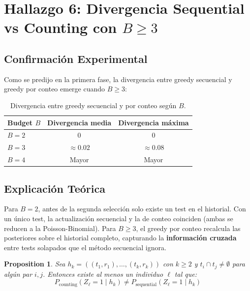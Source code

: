 \documentclass[11pt, a4paper]{article}
\newtheorem{proposition}{Proposition}
\begin{document}
\section{Hallazgo 6: Divergencia Sequential vs Counting con $B \geq 3$}
\label{sec:divergence}

\subsection{Confirmaci\'on Experimental}
Como se predijo en la primera fase, la divergencia entre greedy
secuencial y greedy por conteo emerge cuando $B \geq 3$:

\begin{table}[htbp]
\centering
\caption{Divergencia entre greedy secuencial y por conteo seg\'un $B$.}
\begin{tabular}{lcc}
\toprule
\textbf{Budget $B$} & \textbf{Divergencia media} & \textbf{Divergencia m\'axima} \\
\midrule
$B = 2$ & $0$ & $0$ \\
$B = 3$ & $\approx 0.02$ & $\approx 0.08$ \\
$B = 4$ & Mayor & Mayor \\
\bottomrule
\end{tabular}
\end{table}

\subsection{Explicaci\'on Te\'orica}
Para $B = 2$, antes de la segunda selecci\'on solo existe un test en el
historial. Con un \'unico test, la actualizaci\'on secuencial y la de
conteo coinciden (ambas se reducen a la Poisson-Binomial). Para
$B \geq 3$, el greedy por conteo recalcula las posteriores sobre el
historial completo, capturando la \textbf{informaci\'on cruzada} entre
tests solapados que el m\'etodo secuencial ignora.

\begin{proposition}
Sea $h_k = ((t_1, r_1), \ldots, (t_k, r_k))$ con $k \geq 2$ y
$t_i \cap t_j \neq \emptyset$ para alg\'un par $i, j$. Entonces existe
al menos un individuo $\ell$ tal que:
\begin{equation}
    P_{\text{counting}}(Z_\ell = 1 \mid h_k) \neq
    P_{\text{sequential}}(Z_\ell = 1 \mid h_k)
\end{equation}
\end{proposition}
\end{document}
